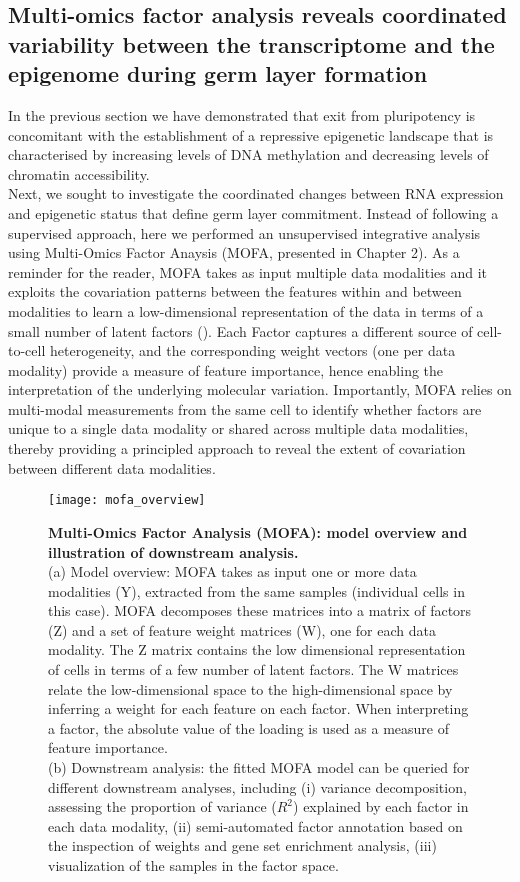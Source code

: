 \subsection{Multi-omics factor analysis reveals coordinated variability between the transcriptome and the epigenome during germ layer formation}

In the previous section we have demonstrated that exit from pluripotency is concomitant with the establishment of a repressive epigenetic landscape that is characterised by increasing levels of DNA methylation and decreasing levels of chromatin accessibility. \\
Next, we sought to investigate the coordinated changes between RNA expression and epigenetic status that define germ layer commitment. Instead of following a supervised approach, here we performed an unsupervised integrative analysis using Multi-Omics Factor Anaysis (MOFA, presented in Chapter 2). As a reminder for the reader, MOFA takes as input multiple data modalities and it exploits the covariation patterns between the features within and between modalities to learn a low-dimensional representation of the data in terms of a small number of latent factors (). Each Factor captures a different source of cell-to-cell heterogeneity, and the corresponding weight vectors (one per data modality) provide a measure of feature importance, hence enabling the interpretation of the underlying molecular variation. Importantly, MOFA relies on multi-modal measurements from the same cell to identify whether factors are unique to a single data modality or shared across multiple data modalities, thereby providing a principled approach to reveal the extent of covariation between different data modalities.

\begin{figure}[H]
	\texttt{[image: mofa\_overview]}
	\caption{
	\textbf{Multi-Omics Factor Analysis (MOFA): model overview and illustration of downstream analysis.} \\
	(a) Model overview: MOFA takes as input one or more data modalities (Y), extracted from the same samples (individual cells in this case). MOFA decomposes these matrices into a matrix of factors (Z) and a set of feature weight matrices (W), one for each data modality. The Z matrix contains the low dimensional representation of cells in terms of a few number of latent factors. The W matrices relate the low-dimensional space to the high-dimensional space by inferring a weight for each feature on each factor. When interpreting a factor, the absolute value of the loading is used as a measure of feature importance. \\
	(b) Downstream analysis: the fitted MOFA model can be queried for different downstream analyses, including (i) variance decomposition, assessing the proportion of variance ($R^2$) explained by each factor in each data modality, (ii) semi-automated factor annotation based on the inspection of weights and gene set enrichment analysis, (iii) visualization of the samples in the factor space. 
	}
	\label{fig:mofa_overview}
\end{figure}

